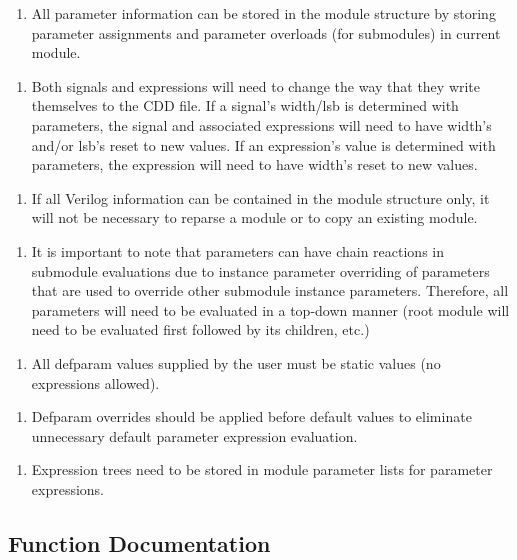\begin{enumerate}
\item 
All parameter information can be stored in the module structure by storing parameter assignments and parameter overloads (for submodules) in current module.\end{enumerate}
\begin{enumerate}
\item 
Both signals and expressions will need to change the way that they write themselves to the CDD file. If a signal's width/lsb is determined with parameters, the signal and associated expressions will need to have width's and/or lsb's reset to new values. If an expression's value is determined with parameters, the expression will need to have width's reset to new values.\end{enumerate}
\begin{enumerate}
\item 
If all Verilog information can be contained in the module structure only, it will not be necessary to reparse a module or to copy an existing module.\end{enumerate}
\begin{enumerate}
\item 
It is important to note that parameters can have chain reactions in submodule evaluations due to instance parameter overriding of parameters that are used to override other submodule instance parameters. Therefore, all parameters will need to be evaluated in a top-down manner (root module will need to be evaluated first followed by its children, etc.)\end{enumerate}
\begin{enumerate}
\item 
All defparam values supplied by the user must be static values (no expressions allowed).\end{enumerate}
\begin{enumerate}
\item 
Defparam overrides should be applied before default values to eliminate unnecessary default parameter expression evaluation.\end{enumerate}
\begin{enumerate}
\item 
Expression trees need to be stored in module parameter lists for parameter expressions.\end{enumerate}


\subsection{Function Documentation}
